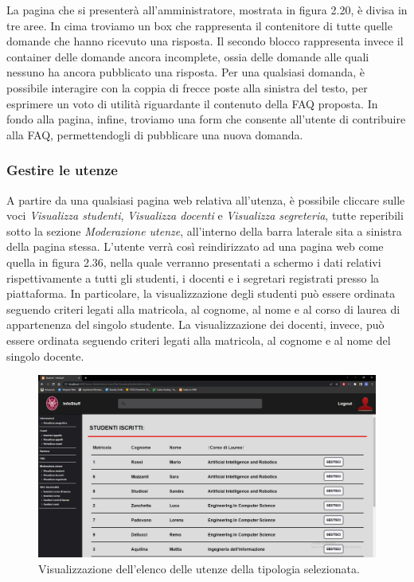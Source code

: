\documentclass [a4paper,11pt]{book}
\begin{document}
La pagina che si presenterà all'amministratore, mostrata in figura 2.20, è divisa in tre aree. In cima troviamo un box che rappresenta il contenitore di tutte quelle domande che hanno ricevuto una risposta. Il secondo blocco rappresenta invece il container delle domande ancora incomplete, ossia delle domande alle quali nessuno ha ancora pubblicato una risposta. Per una qualsiasi domanda, è possibile interagire con la coppia di frecce poste alla sinistra del testo, per esprimere un voto di utilità riguardante il contenuto della FAQ proposta. In fondo alla pagina, infine, troviamo una form che consente all'utente di contribuire alla FAQ, permettendogli di pubblicare una nuova domanda. 

\medskip

\subsubsection{Gestire le utenze}	

A partire da una qualsiasi pagina web relativa all'utenza, è possibile cliccare sulle voci \emph{Visualizza studenti}, \emph{Visualizza docenti} e \emph{Visualizza segreteria}, tutte reperibili sotto la sezione \emph{Moderazione utenze}, all'interno della barra laterale sita a sinistra della pagina stessa. L'utente verrà così reindirizzato ad una pagina web come quella in figura 2.36, nella quale verranno presentati a schermo i dati relativi rispettivamente a tutti gli studenti, i docenti e i segretari registrati presso la piattaforma. In particolare, la visualizzazione degli studenti può essere ordinata seguendo criteri legati alla matricola, al cognome, al nome e al corso di laurea di appartenenza del singolo studente. La visualizzazione dei docenti, invece, può essere ordinata seguendo criteri legati alla matricola, al cognome e al nome del singolo docente.

\begin{figure}
\centering
\includegraphics[scale=0.3]{figura2-36.png}
\caption{Visualizzazione dell'elenco delle utenze della tipologia selezionata.}
\end{figure}
\end{document}
